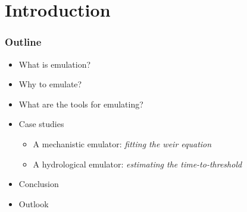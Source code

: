 \documentclass[xcolor=dvipsnames, USenglish]{beamer}  %
\begin{document}
\section{Introduction}

  \begin{frame}
    \frametitle{Outline}
    \begin{itemize}
      \item What is emulation?
      \item Why to emulate?
      \item What are the tools for emulating?
      \item Case studies
      \begin{itemize}
        \item A mechanistic emulator: \emph{fitting the weir equation}
        \item A hydrological emulator: \emph{estimating the time-to-threshold}
      \end{itemize}
      \item Conclusion
      \item Outlook
     \end{itemize}
  \end{frame}
\end{document}
